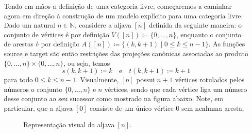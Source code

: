 Tendo em mãos a definição de uma categoria livre, começaremos a caminhar agora em direção à construção de um modelo explícito para uma categoria livre.
Dado um natural $n \in \mathbb{N}$, considere a aljava $[n]$ definida da seguinte maneira: o conjunto de vértices é por definição $V([n]) \coloneqq \{0,\dots,n\}$, enquanto o conjunto de arestas é por definição $A([n]) \coloneqq \{(k,k+1) \mid 0 \leq k \leq n-1\}$.
As funções source e target são então restrições das projeções canônicas associadas ao produto $\{0,\dots,n\} \times \{0,\dots,n\}$, ou seja, temos
\begin{displaymath}
    s(k,k+1) \coloneqq k
    \quad \text{e} \quad
    t(k,k+1) \coloneqq k+1
\end{displaymath}
para todo $0 \leq k \leq n-1$.
Visualmente, $[n]$ possui $n+1$ vértices rotulados pelos números o conjunto $\{0,\dots,n\}$ e $n$ vértices, sendo que cada vértice liga um número desse conjunto ao seu sucessor como mostrado na figura abaixo.
Note, em particular, que a aljava $[0]$ consiste de um único vértice $0$ sem nenhuma aresta.

\begin{figure}[h]
    \centering
    \caption{Representação visual da aljava $[n]$.}
    \label{fig:aljava_ordinal}
\end{figure}

